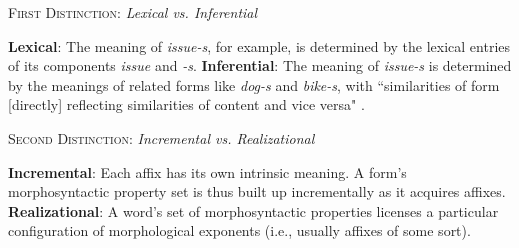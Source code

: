 \begin{exe}
\ex \textsc{First Distinction}: \textit{Lexical vs. Inferential} %
\begin{xlist}
	\ex \textbf{Lexical}: The meaning of \textit{issue-s}, for example, is determined by the lexical entries of its components \textit{issue} and \textit{-s}.
	\ex \textbf{Inferential}: The meaning of \textit{issue-s} is determined by the meanings of related forms like \textit{dog-s} and \textit{bike-s},
with ``similarities of form [directly] reflecting similarities of content and vice versa" \citep[][p. 2]{anderson:2015shorthist}. \label{ex:d-one-b}
	\end{xlist}
\ex \textsc{Second Distinction}: \textit{Incremental vs. Realizational} %
\begin{xlist} 
	\ex \textbf{Incremental}: Each affix has its own intrinsic meaning. 
	A form's morphosyntactic property set is thus built up incrementally as it acquires affixes.
	\label{ex:d-two-a}
	\ex \textbf{Realizational}: A word's set of morphosyntactic properties 
	licenses a particular configuration of morphological exponents 
	(i.e., usually affixes of some sort). 
	\end{xlist}
\end{exe}

